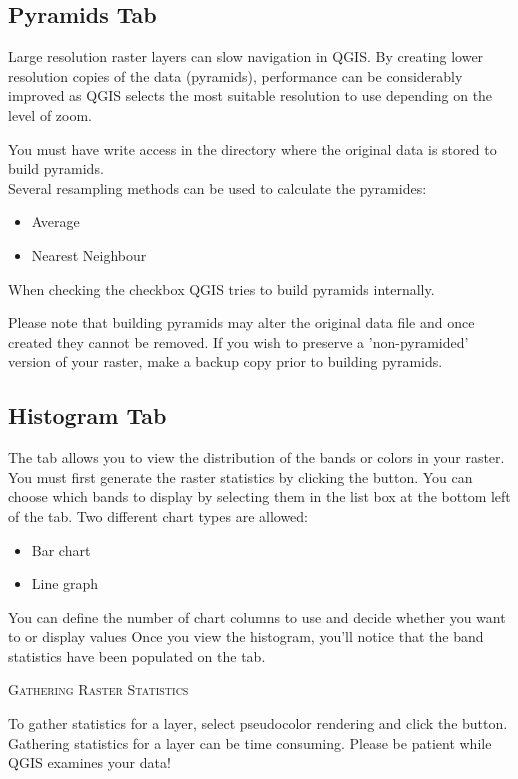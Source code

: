 \subsection{Pyramids Tab}\label{raster_pyramids}

Large resolution raster layers can slow navigation in QGIS. By creating lower
resolution copies of the data (pyramids), performance can be considerably
improved as QGIS selects the most suitable resolution to use depending on the
level of zoom.

You must have write access in the directory where the original data is stored
to build pyramids. \\
Several resampling methods can be used to calculate the pyramides:
\begin{itemize}[label=--]
\item Average
\item Nearest Neighbour
\end{itemize}

When checking the checkbox  QGIS tries to build pyramids internally.

Please note that building pyramids may alter the original data file and once
created they cannot be removed. If you wish to preserve a 'non-pyramided'
version of your raster, make a backup copy prior to building pyramids.

\subsection{Histogram Tab}\label{label_histogram}

The  tab allows you to view the distribution 
of the bands or colors in your raster. You must first generate the raster statistics 
by clicking the  button. You can choose which bands to display by 
selecting them in the list box at the bottom left of the tab. Two different
chart types are allowed: 

\begin{itemize}[label=--]
\item Bar chart
\item Line graph
\end{itemize}

You can define the number of chart columns to use and decide whether you want 
to  or display  values 
Once you view the histogram, you'll notice that the band statistics have been
populated on the  tab.

\begin{Tip}\caption{\textsc{Gathering Raster Statistics}}
To gather statistics for a layer, select pseudocolor rendering and
click the  button. Gathering statistics for a layer can be time
consuming. Please be patient while QGIS examines your
data!
\end{Tip}
